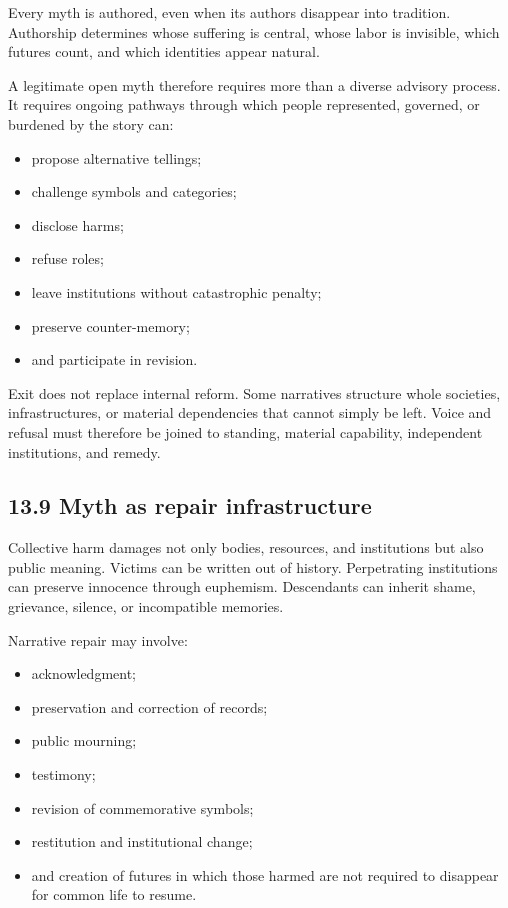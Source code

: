 \documentclass[
  11pt,
]{article}
\providecommand{\tightlist}{%
  \setlength{\itemsep}{0pt}\setlength{\parskip}{0pt}}
\begin{document}
Every myth is authored, even when its authors disappear into tradition.
Authorship determines whose suffering is central, whose labor is
invisible, which futures count, and which identities appear natural.

A legitimate open myth therefore requires more than a diverse advisory
process. It requires ongoing pathways through which people represented,
governed, or burdened by the story can:

\begin{itemize}
\tightlist
\item
  propose alternative tellings;
\item
  challenge symbols and categories;
\item
  disclose harms;
\item
  refuse roles;
\item
  leave institutions without catastrophic penalty;
\item
  preserve counter-memory;
\item
  and participate in revision.
\end{itemize}

Exit does not replace internal reform. Some narratives structure whole
societies, infrastructures, or material dependencies that cannot simply
be left. Voice and refusal must therefore be joined to standing,
material capability, independent institutions, and remedy.

\subsection{13.9 Myth as repair
infrastructure}\label{myth-as-repair-infrastructure}

Collective harm damages not only bodies, resources, and institutions but
also public meaning. Victims can be written out of history. Perpetrating
institutions can preserve innocence through euphemism. Descendants can
inherit shame, grievance, silence, or incompatible memories.

Narrative repair may involve:

\begin{itemize}
\tightlist
\item
  acknowledgment;
\item
  preservation and correction of records;
\item
  public mourning;
\item
  testimony;
\item
  revision of commemorative symbols;
\item
  restitution and institutional change;
\item
  and creation of futures in which those harmed are not required to
  disappear for common life to resume.
\end{itemize}
\end{document}
